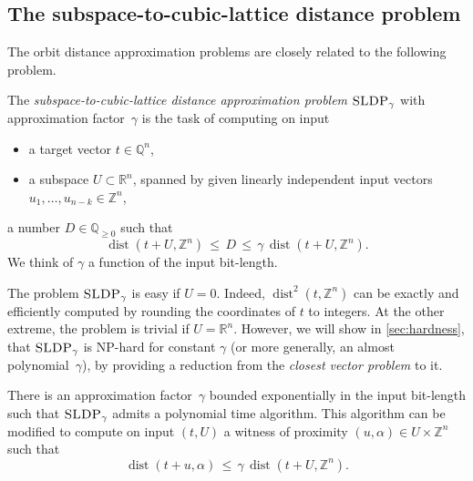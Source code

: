 \documentclass[a4paper,USenglish,cleveref,numberwithinsect]{lipics-v2021}
\DeclareMathOperator{\dist}{dist}
\newcommand{\QQ}{\mathbb{Q}}
\newcommand{\ZZ}{\mathbb{Z}}
\newcommand{\RR}{\mathbb{R}}
\numberwithin{equation}{section}
\begin{document}
\subsection{The subspace-to-cubic-lattice distance problem}\label{sec:sldp-and-rop}
The orbit distance approximation problems are closely related to the following problem.

\begin{definition}
\label{def:gapsldp}
The {\em subspace-to-cubic-lattice distance approximation problem} $\textsc{SLDP}_\gamma$
with approximation factor~$\gamma$
is the task of computing on input
\begin{itemize}
\item a target vector $t\in\QQ^n$,
\item a subspace $U\subset\RR^n$, spanned by given linearly independent input vectors
   $u_1,\dots,u_{n-k}\in\ZZ^n$,
\end{itemize}
a number $D\in\QQ_{\geq 0}$ such that
\[
 \dist(t+U,\ZZ^n)\, \leq \, D \, \leq \, \gamma \, \dist(t+U,\ZZ^n).
\]
We think of $\gamma$ a function of the input bit-length.
\end{definition}


\begin{remark}
The problem $\textsc{SLDP}_\gamma$ is easy if $U=0$.
Indeed, $\dist^2(t,\ZZ^n)$ can be exactly and efficiently computed by rounding
the coordinates of $t$ to integers.
At the other extreme, the problem is trivial if $U=\RR^n$.
However, we will show in \cref{sec:hardness}, that $\textsc{SLDP}_\gamma$ is
\textsc{NP}-hard for constant $\gamma$ (or more generally, an almost polynomial~$\gamma$),
by providing a reduction from the \textit{closest vector problem} to it.
\end{remark}

\begin{proposition}\label{thm:sldp-is-in-p}
There is an approximation factor~$\gamma$ bounded exponentially in the input bit-length such that $\textsc{SLDP}_\gamma$ admits a polynomial time algorithm.
This algorithm can be modified to compute
on input $(t,U)$ a witness of proximity
$(u,\alpha)\in U\times\ZZ^n$ such that
\begin{equation*}%
  \dist(t+u,\alpha) \, \leq \, \gamma\, \dist(t+U,\ZZ^n).
\end{equation*}
\end{proposition}
\end{document}
